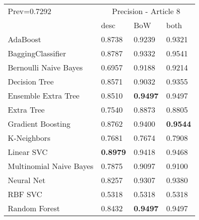 \begin{tabular}{|l|l|l|l| }
\hline
Prev=0.7292 &  \multicolumn{3}{c|}{Precision - Article 8} \\
\cline{2-4} & desc & BoW & both \\ \hline
AdaBoost                & 0.8738 & 0.9239 & 0.9321\\
BaggingClassifier       & 0.8787 & 0.9332 & 0.9541\\
Bernoulli Naive Bayes   & 0.6957 & 0.9188 & 0.9214\\
Decision Tree           & 0.8571 & 0.9032 & 0.9355\\
Ensemble Extra Tree     & 0.8510 & {\bf 0.9497} & 0.9497\\
Extra Tree              & 0.7540 & 0.8873 & 0.8805\\
Gradient Boosting       & 0.8762 & 0.9400 & {\bf 0.9544}\\
K-Neighbors             & 0.7681 & 0.7674 & 0.7908\\
Linear SVC              & {\bf 0.8979} & 0.9418 & 0.9468\\
Multinomial Naive Bayes & 0.7875 & 0.9097 & 0.9100\\
Neural Net              & 0.8257 & 0.9307 & 0.9380\\
RBF SVC                 & 0.5318 & 0.5318 & 0.5318\\
Random Forest           & 0.8432 & {\bf 0.9497} & 0.9497\\
\hline
\end{tabular}